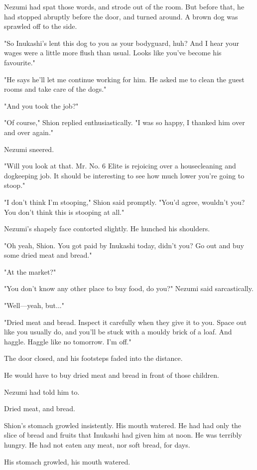 Nezumi had spat those words, and strode out of the room. But before
that, he had stopped abruptly before the door, and turned around. A
brown dog was sprawled off to the side.

"So Inukashi's lent this dog to you as your bodyguard, huh? And I hear
your wages were a little more flush than usual. Looks like you've become
his favourite."

"He says he'll let me continue working for him. He asked me to clean the
guest rooms and take care of the dogs."

"And you took the job?"

"Of course," Shion replied enthusiastically. "I was so happy, I thanked
him over and over again."

Nezumi sneered.

"Will you look at that. Mr. No. 6 Elite is rejoicing over a
housecleaning and dogkeeping job. It should be interesting to see how
much lower you're going to stoop."

"I don't think I'm stooping," Shion said promptly. "You'd agree,
wouldn't you? You don't think this is stooping at all."

Nezumi's shapely face contorted slightly. He hunched his shoulders.

"Oh yeah, Shion. You got paid by Inukashi today, didn't you? Go out and
buy some dried meat and bread."

"At the market?"

"You don't know any other place to buy food, do you?" Nezumi said
sarcastically.

"Well---yeah, but..."

"Dried meat and bread. Inspect it carefully when they give it to you.
Space out like you usually do, and you'll be stuck with a mouldy brick
of a loaf. And haggle. Haggle like no tomorrow. I'm off."

The door closed, and his footsteps faded into the distance.

He would have to buy dried meat and bread in front of those children.

Nezumi had told him to.

Dried meat, and bread.

Shion's stomach growled insistently. His mouth watered. He had had only
the slice of bread and fruits that Inukashi had given him at noon. He
was terribly hungry. He had not eaten any meat, nor soft bread, for
days.

His stomach growled, his mouth watered.

